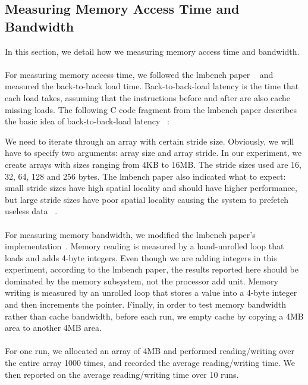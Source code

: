 \subsection{Measuring Memory Access Time and Bandwidth}
In this section, 
we detail how we measuring memory access time and bandwidth.\\
\\
For measuring memory access time, we followed the lmbench paper ~\cite{mcvoy1996lmbench} and measured the back-to-back load time.
Back-to-back-load latency is the time that each load takes, assuming that
the instructions before and after are also cache missing loads. 
The following C code fragment from the lmbench paper describes the basic idea of back-to-back-load latency ~\cite{mcvoy1996lmbench}:

We need to iterate through an array with certain stride size.
Obviously, we will have to specify two arguments: array size and array stride. 
In our experiment, we create arrays with sizes ranging from 4KB to 16MB. 
The stride sizes used are 16, 32, 64, 128 and 256 bytes.
The lmbench paper also indicated what to expect: small stride sizes have high spatial locality and should have higher performance, but
large stride sizes have poor spatial locality causing the
system to prefetch useless data ~\cite{mcvoy1996lmbench}.\\
\\
For measuring memory bandwidth, we modified the lmbench paper's implementation~\cite{mcvoy1996lmbench}.
Memory reading is measured by a hand-unrolled loop that loads and adds 4-byte integers.
Even though we are adding integers in this experiment, 
according to the lmbench paper, the
results reported here should be dominated by the
memory subsystem, not the processor add unit.
Memory writing is measured by an unrolled loop
that stores a value into a 4-byte integer and then increments the pointer.
Finally, in order to test memory bandwidth
rather than cache bandwidth, 
before each run,
we empty cache by copying a 4MB area to another 4MB area.\\
\\
For one run, we allocated an array of 4MB and performed reading/writing over the entire array 1000 times, 
and recorded the average reading/writing time.
We then reported on the average reading/writing time over 10 runs.



